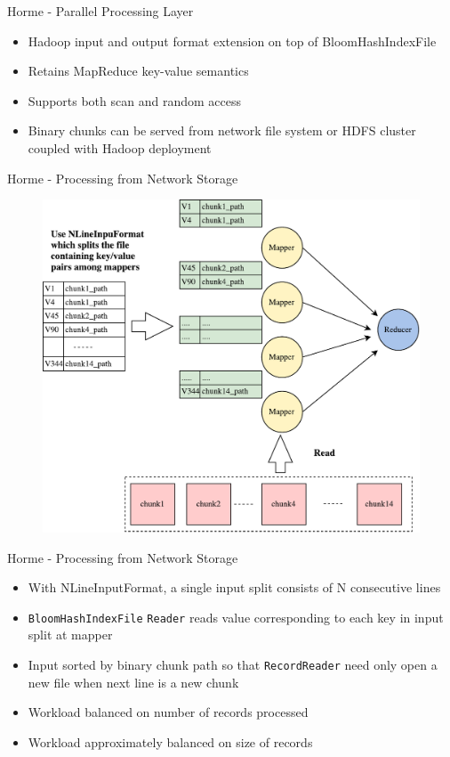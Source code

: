 \documentclass[newPxFont]{beamer}
\begin{document}
\begin{frame}[c]{Horme - Parallel Processing Layer}
  \begin{itemize}
    \item Hadoop input and output format extension on top of BloomHashIndexFile
    \item Retains MapReduce key-value semantics 
    \item Supports both scan and random access 
    \item Binary chunks can be served from network file system or HDFS cluster coupled with Hadoop deployment
  \end{itemize}
\end{frame}

\begin{frame}[c]{Horme - Processing from Network Storage}
\begin{figure}[t]
  \includegraphics[scale=0.4]{horme-with-pfs}
  \centering
\end{figure}
\end{frame}

\begin{frame}[c]{Horme - Processing from Network Storage}
\begin{itemize}
  \item With NLineInputFormat, a single input split consists of N consecutive lines
  \item \texttt{BloomHashIndexFile} \texttt{Reader} reads value corresponding to each key in input split at mapper
  \item Input sorted by binary chunk path so that \texttt{RecordReader} need only open a new file when next line is a new chunk
  \item Workload balanced on number of records processed
  \item Workload approximately balanced on size of records 
\end{itemize}
\end{frame}
\end{document}
